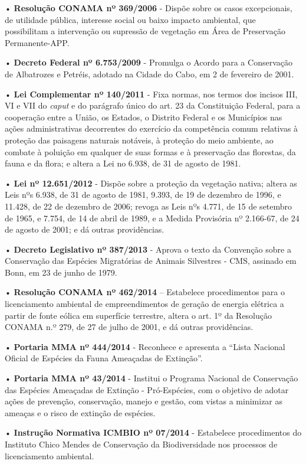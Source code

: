 \documentclass[
  oneside]{scrbook}
\begin{document}
• \textbf{Resolução CONAMA nº 369/2006} - Dispõe sobre os casos excepcionais, de utilidade pública, interesse social ou baixo impacto ambiental, que possibilitam a intervenção ou supressão de vegetação em Área de Preservação Permanente-APP.

• \textbf{Decreto Federal nº 6.753/2009} - Promulga o Acordo para a Conservação de Albatrozes e Petréis, adotado na Cidade do Cabo, em 2 de fevereiro de 2001.

• \textbf{Lei Complementar nº 140/2011} - Fixa normas, nos termos dos incisos III, VI e VII do \emph{caput} e do parágrafo único do art. 23 da Constituição Federal, para a cooperação entre a União, os Estados, o Distrito Federal e os Municípios nas ações administrativas decorrentes do exercício da competência comum relativas à proteção das paisagens naturais notáveis, à proteção do meio ambiente, ao combate à poluição em qualquer de suas formas e à preservação das florestas, da fauna e da flora; e altera a Lei no 6.938, de 31 de agosto de 1981.

• \textbf{Lei nº 12.651/2012} - Dispõe sobre a proteção da vegetação nativa; altera as Leis nºs 6.938, de 31 de agosto de 1981, 9.393, de 19 de dezembro de 1996, e 11.428, de 22 de dezembro de 2006; revoga as Leis nºs 4.771, de 15 de setembro de 1965, e 7.754, de 14 de abril de 1989, e a Medida Provisória nº 2.166-67, de 24 de agosto de 2001; e dá outras providências.

• \textbf{Decreto Legislativo nº 387/2013} - Aprova o texto da Convenção sobre a Conservação das Espécies Migratórias de Animais Silvestres - CMS, assinado em Bonn, em 23 de junho de 1979.

• \textbf{Resolução CONAMA nº 462/2014} -- Estabelece procedimentos para o licenciamento ambiental de empreendimentos de geração de energia elétrica a partir de fonte eólica em superfície terrestre, altera o art. 1º da Resolução CONAMA n.º 279, de 27 de julho de 2001, e dá outras providências.

• \textbf{Portaria MMA nº 444/2014} - Reconhece e apresenta a ``Lista Nacional Oficial de Espécies da Fauna Ameaçadas de Extinção''.

• \textbf{Portaria MMA nº 43/2014} - Institui o Programa Nacional de Conservação das Espécies Ameaçadas de Extinção - Pró-Espécies, com o objetivo de adotar ações de prevenção, conservação, manejo e gestão, com vistas a minimizar as ameaças e o risco de extinção de espécies.

• \textbf{Instrução Normativa ICMBIO nº 07/2014} - Estabelece procedimentos do Instituto Chico Mendes de Conservação da Biodiversidade nos processos de licenciamento ambiental.
\end{document}
